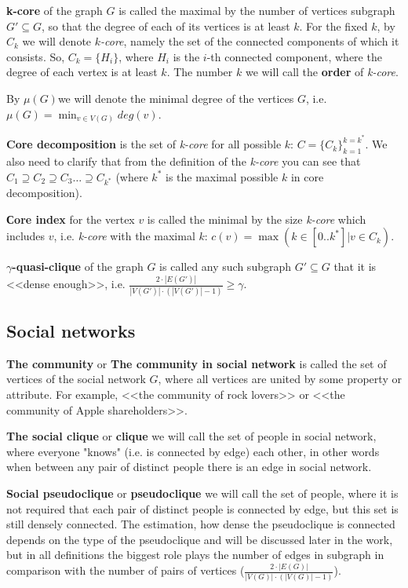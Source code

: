 \textbf{k-core} of the graph $G$ is called the maximal by the number of vertices subgraph $G' \subseteq G$, so that the degree of each of its vertices is at least $k$. For the fixed $k$, by $C_k$ we will denote \textit{$k$-core}, namely the set of the connected components of which it consists. So, $C_k = \{H_i\}$, where $H_i$ is the $i$-th connected component, where the degree of each vertex is at least $k$. The number $k$ we will call the \textbf{order} of \textit{k-core}.

By \boldmath$\mu(G)$\unboldmath we will denote the minimal degree of the vertices $G$, i.e. $\mu(G) = \min_{v \in V(G)} deg(v)$.

\textbf{Core decomposition} is the set of \textit{k-core} for all possible $k$: $C = \{C_k\}_{k=1}^{k=k^*}$. We also need to clarify that from the definition of the \textit{k-core} you can see that $C_1 \supseteq C_2 \supseteq C_3 \ldots \supseteq C_{k^*}$ (where $k^*$ is the maximal possible $k$ in core decomposition).

\textbf{Сore index} for the vertex $v$ is called the minimal by the size \textit{k-core} which includes $v$, i.e. \textit{k-core} with the maximal $k$: $c(v) = \max(k \in [0..k^*] | v \in C_k)$.

\textbf{$\gamma$-quasi-clique} of the graph $G$ is called any such subgraph $G' \subseteq G$ that it is <<dense enough>>, i.e. $\frac{2 \cdot |E(G')|}{|V(G')| \cdot (|V(G')| - 1)} \ge \gamma$.

\subsection{Social networks}

\textbf{The community} or \textbf{The community in social network} is called the set of vertices of the social network $G$, where all vertices are united by some property or attribute. For example, <<the community of rock lovers>> or <<the community of Apple shareholders>>.

\textbf{The social clique} or \textbf{clique} we will call the set of people in social network, where everyone "knows" (i.e. is connected by edge) each other, in other words when between any pair of distinct people there is an edge in social network.

\textbf{Social pseudoclique} or \textbf{pseudoclique} we will call the set of people, where it is not required that each pair of distinct people is connected by edge, but this set is still densely connected. The estimation, how dense the pseudoclique is connected depends on the type of the pseudoclique and will be discussed later in the work, but in all definitions the biggest role plays the number of edges in subgraph in comparison with the number of pairs of vertices ($\frac{2 \cdot |E(G)|}{|V(G)| \cdot (|V(G)| - 1)}$).

